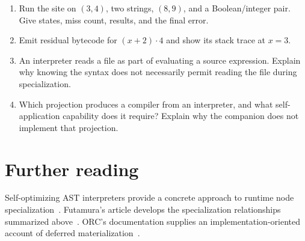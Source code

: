 \begin{enumerate}
\item\label{ex:ch65-transition} Run the site on $(3,4)$, two strings, $(8,9)$, and a Boolean/integer pair.
Give states, miss count, results, and the final error.
\item\label{ex:ch65-stack} Emit residual bytecode for $(x+2)\cdot4$ and show its stack trace at $x=3$.
\item\label{ex:ch65-effect} An interpreter reads a file as part of evaluating a source expression.
Explain why knowing the syntax does not necessarily permit reading the file during specialization.
\item\label{ex:ch65-projection} Which projection produces a compiler from an interpreter, and what self-application capability does it require?
Explain why the companion does not implement that projection.
\end{enumerate}

\section{Further reading}
\label{sec:ch65-reading}

Self-optimizing AST interpreters provide a concrete approach to runtime node specialization~\cite{wurthinger-2012-interpreters}.
Futamura's article develops the specialization relationships summarized above~\cite{futamura-1999-partial}.
ORC's documentation supplies an implementation-oriented account of deferred materialization~\cite{llvm-2026-orc}.
